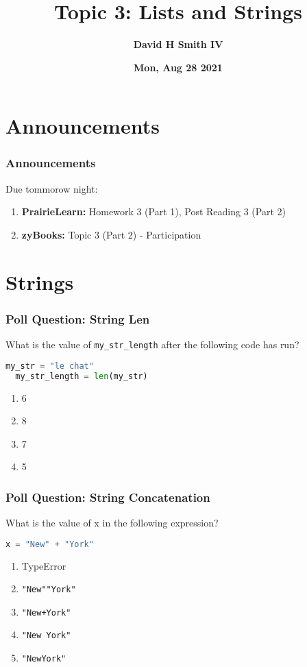 \documentclass{beamer}
\title{\textbf{Topic 3: Lists and  Strings}}
\author{\textbf{David H Smith IV}}
\institute[\textbf{UIUC}]{\textbf{University of Illinois Urbana-Champaign}}
\date{\textbf{Mon, Aug 28 2021}}
\begin{document}
\frame{\titlepage}

\section{Announcements}

%
%
\begin{frame}
  \frametitle{Announcements}
  Due tommorow night:
  \begin{enumerate}
    \item \textbf{PrairieLearn: } Homework 3 (Part 1), Post Reading 3 (Part 2)
    \item \textbf{zyBooks: } Topic 3 (Part 2) - Participation
  \end{enumerate}
\end{frame}

\section{Strings}

%
%
\begin{frame}[fragile]
  \frametitle{Poll Question: String Len}
  What is the value of \lstinline|my_str_length| after the following code has run?
  \begin{lstlisting}[language=Python, autogobble] 
  my_str = "le chat"
  my_str_length = len(my_str)
  \end{lstlisting}
  \vfill
  \begin{enumerate}[A]
    \item 6
    \item 8
    \item 7 
    \item 5
  \end{enumerate}
\end{frame}

%
%
\begin{frame}[fragile]
  \frametitle{Poll Question: String Concatenation}
  What is the value of x in the following expression?
  \begin{lstlisting}[language=Python, autogobble] 
  x = "New" + "York"
  \end{lstlisting}
  \vfill
  \begin{enumerate}[A] 
    \item TypeError
    \item \lstinline{"New""York"} 
    \item \lstinline{"New+York"} 
    \item \lstinline{"New York"} 
    \item \lstinline{"NewYork"} 
  \end{enumerate}
\end{frame}
\end{document}
